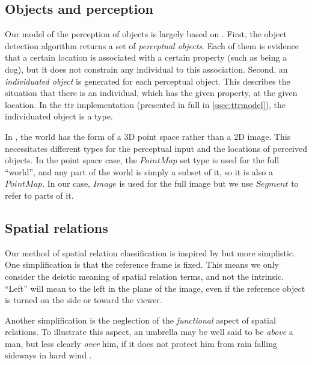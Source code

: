 \subsection{Objects and perception}

Our model of the perception of objects is largely based on \cite{lspc}.
First, the object detection algorithm returns a set of \textit{perceptual objects}.
Each of them is evidence that a certain location is associated with a certain property (such as being a dog), but it does not constrain any individual to this association.
Second, an \textit{individuated object} is generated for each perceptual object.
This describes the situation that there is an individual, which has the given property, at the given location.
In the \gls{ttr} implementation (presented in full in \autoref{ssec:ttrmodel}), the individuated object is a type.

In \cite{lspc}, the world has the form of a 3D point space rather than a 2D image.
This necessitates different types for the perceptual input and the locations of perceived objects.
In the point space case, the $PointMap$ set type is used for the full ``world'', and any part of the world is simply a subset of it, so it is also a $PointMap$.
In our case, $Image$ is used for the full image but we use $Segment$ to refer to parts of it.



\subsection{Spatial relations}
\label{sec:method-spatrel}

Our method of spatial relation classification is inspired by \cite{ttrspat} but more simplistic.
One simplification is that the reference frame is fixed.
This means we only consider the deictic meaning of spatial relation terms, and not the intrinsic.
``Left'' will mean to the left in the plane of the image, even if the reference object is turned on the side or toward the viewer.

Another simplification is the neglection of the \textit{functional} aspect of spatial relations.
To illustrate this aspect, an umbrella may be well said to be \textit{above} a man, but less clearly \textit{over} him, if it does not protect him from rain falling sideways in hard wind \citep{CoventryInterplayGeometryFunction2001}.

